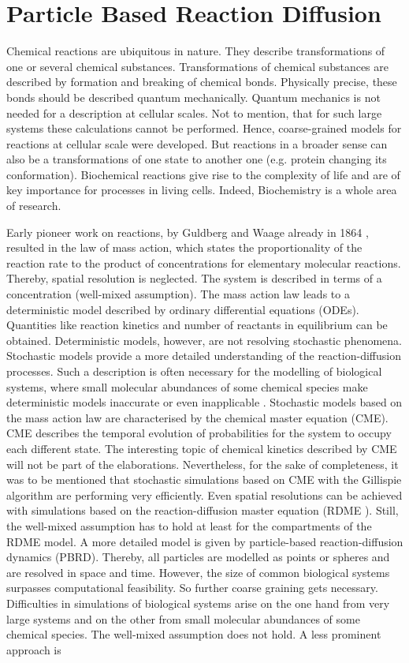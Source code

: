 \documentclass[
  a4paper,BCOR10mm,twoside,
  headsepline,footsepline,%
  fleqn,openbib
]{scrbook}
\begin{document}
\chapter{Particle Based Reaction Diffusion }
Chemical reactions are ubiquitous in nature. They describe transformations of one or several chemical substances. Transformations of chemical substances are described by formation and breaking of chemical bonds. Physically precise, these bonds should be described quantum mechanically. Quantum mechanics is not needed for a description at cellular scales. Not to mention, that for such large systems these calculations cannot be performed. Hence, coarse-grained models for reactions at cellular scale were developed. But reactions in a broader sense can also be a transformations of one state to another one (e.g. protein changing its conformation). Biochemical reactions give rise to the complexity of life and are of key importance for processes in living cells. Indeed, Biochemistry is a whole area of research.\par Early pioneer work on reactions, by Guldberg and Waage already in 1864 \cite{Waage1986}, resulted in the law of mass action, which states the proportionality of the reaction rate to the product of concentrations for elementary molecular reactions. Thereby, spatial resolution is neglected. The system is described in terms of a concentration (well-mixed assumption). The mass action law leads to a deterministic model described by ordinary differential equations (ODEs). Quantities like reaction kinetics and number of reactants in equilibrium can be obtained. Deterministic models, however, are not resolving stochastic phenomena. Stochastic models provide a more detailed understanding of the reaction-diffusion processes. Such a description is often necessary for the modelling of biological systems, where small molecular abundances of some chemical species make deterministic models inaccurate or even inapplicable \cite{0704.1908}. Stochastic models based on the mass action law are characterised by the chemical master equation (CME). CME describes the temporal evolution of probabilities for the system to occupy each different state. The interesting topic of chemical kinetics described by CME will not be part of the elaborations. Nevertheless, for the sake of completeness, it was to be mentioned that stochastic simulations based on CME with the Gillispie algorithm \cite{Gillespie1977} are performing very efficiently. Even spatial resolutions can be achieved with simulations based on the reaction-diffusion master equation (RDME \cite{Winkelmann2016}). Still, the well-mixed assumption has to hold at least for the compartments of the RDME model. A more detailed model is given by particle-based reaction-diffusion dynamics (PBRD)\cite{Schneberg2014,Gruenert2010}. Thereby, all particles are modelled as points or spheres and are resolved in space and time. However, the size  of common biological systems surpasses computational feasibility. So further coarse graining gets necessary. Difficulties in simulations of biological systems arise on the one hand from very large systems and on the other from small molecular abundances of some chemical species. The well-mixed assumption does not hold.  A less prominent approach is 
\end{document}
